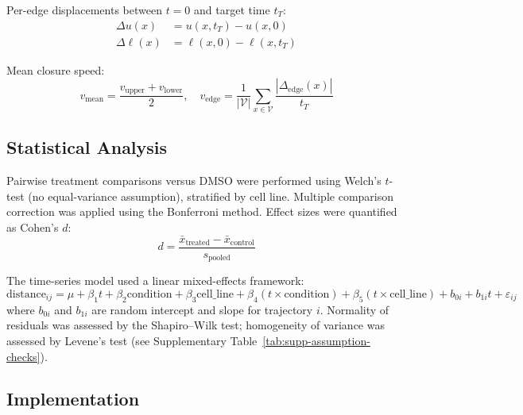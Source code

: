 Per-edge displacements between $t = 0$ and target time $t_T$:
\begin{align}
  \Delta u(x) &= u(x, t_T) - u(x, 0) \label{eq:delta-upper} \\
  \Delta \ell(x) &= \ell(x, 0) - \ell(x, t_T) \label{eq:delta-lower}
\end{align}

Mean closure speed:
\begin{equation}
  v_\text{mean} = \frac{v_\text{upper} + v_\text{lower}}{2}, \quad
  v_\text{edge} = \frac{1}{|\mathcal{V}|} \sum_{x \in \mathcal{V}} \frac{|\Delta_\text{edge}(x)|}{t_T}
  \label{eq:closure-speed}
\end{equation}

\subsection{Statistical Analysis}

Pairwise treatment comparisons versus DMSO were performed using Welch's $t$-test
(no equal-variance assumption), stratified by cell line.
Multiple comparison correction was applied using the Bonferroni method.
Effect sizes were quantified as Cohen's $d$:
\begin{equation}
  d = \frac{\bar{x}_\text{treated} - \bar{x}_\text{control}}{s_\text{pooled}}
  \label{eq:cohens-d}
\end{equation}

The time-series model used a linear mixed-effects framework:
\begin{equation}
  \text{distance}_{ij} = \mu + \beta_1 t + \beta_2 \text{condition} + \beta_3 \text{cell\_line}
    + \beta_4 (t \times \text{condition}) + \beta_5 (t \times \text{cell\_line})
    + b_{0i} + b_{1i} t + \varepsilon_{ij}
  \label{eq:mixed-model}
\end{equation}
where $b_{0i}$ and $b_{1i}$ are random intercept and slope for trajectory $i$.
Normality of residuals was assessed by the Shapiro--Wilk test; homogeneity of variance was
assessed by Levene's test (see Supplementary Table~\ref{tab:supp-assumption-checks}).

\subsection{Implementation}

